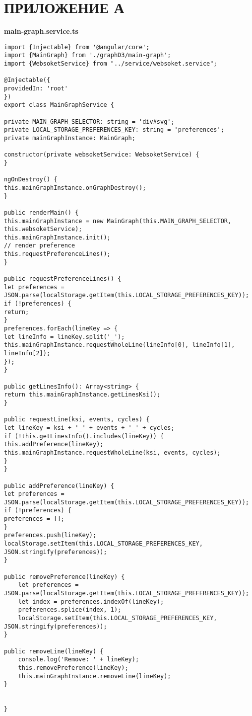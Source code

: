 \chapter*{ПРИЛОЖЕНИЕ А}

\textbf{main-graph.service.ts}

\begin{lstlisting}
import {Injectable} from '@angular/core';
import {MainGraph} from './graphD3/main-graph';
import {WebsoketService} from "../service/websoket.service";

@Injectable({
providedIn: 'root'
})
export class MainGraphService {

private MAIN_GRAPH_SELECTOR: string = 'div#svg';
private LOCAL_STORAGE_PREFERENCES_KEY: string = 'preferences';
private mainGraphInstance: MainGraph;

constructor(private websoketService: WebsoketService) {
}

ngOnDestroy() {
this.mainGraphInstance.onGraphDestroy();
}

public renderMain() {
this.mainGraphInstance = new MainGraph(this.MAIN_GRAPH_SELECTOR, this.websoketService);
this.mainGraphInstance.init();
// render preference
this.requestPreferenceLines();
}

public requestPreferenceLines() {
let preferences = JSON.parse(localStorage.getItem(this.LOCAL_STORAGE_PREFERENCES_KEY));
if (!preferences) {
return;
}
preferences.forEach(lineKey => {
let lineInfo = lineKey.split('_');
this.mainGraphInstance.requestWholeLine(lineInfo[0], lineInfo[1], lineInfo[2]);
});
}

public getLinesInfo(): Array<string> {
return this.mainGraphInstance.getLinesKsi();
}

public requestLine(ksi, events, cycles) {
let lineKey = ksi + '_' + events + '_' + cycles;
if (!this.getLinesInfo().includes(lineKey)) {
this.addPreference(lineKey);
this.mainGraphInstance.requestWholeLine(ksi, events, cycles);
}
}

public addPreference(lineKey) {
let preferences = JSON.parse(localStorage.getItem(this.LOCAL_STORAGE_PREFERENCES_KEY));
if (!preferences) {
preferences = [];
}
preferences.push(lineKey);
localStorage.setItem(this.LOCAL_STORAGE_PREFERENCES_KEY, JSON.stringify(preferences));
}

public removePreference(lineKey) {
	let preferences = JSON.parse(localStorage.getItem(this.LOCAL_STORAGE_PREFERENCES_KEY));
	let index = preferences.indexOf(lineKey);
	preferences.splice(index, 1);
	localStorage.setItem(this.LOCAL_STORAGE_PREFERENCES_KEY, JSON.stringify(preferences));
}

public removeLine(lineKey) {
	console.log('Remove: ' + lineKey);
	this.removePreference(lineKey);
	this.mainGraphInstance.removeLine(lineKey);
}


}
\end{lstlisting}